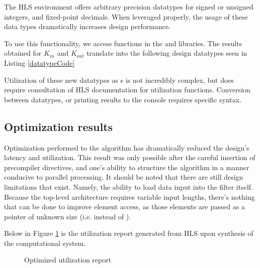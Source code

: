 \documentclass[../report_polarFIR.tex]{subfiles}
\begin{document}
The HLS environment offers arbitrary precision datatypes for signed or unsigned integers, and fixed-point decimals. When leveraged properly, the usage of these data types dramatically increases design performance. 

To use this functionality, we access functions in the  and  libraries. The results obtained for $K_{in}$ and $K_{out}$ translate into the following design datatypes seen in Listing \ref{datatypeCode}


\begin{quote}
\begin{singlespace}
    
\end{singlespace}
\end{quote}

Utilization of these new datatypes as s is not incredibly complex, but does require consultation of HLS documentation for utilization functions. Conversion between datatypes, or printing results to the console requires specific syntax.

\subsection{Optimization results}

Optimization performed to the algorithm has dramatically reduced the design's latency and utilization. This result was only possible after the careful insertion of precompiler directives, and one's ability to structure the algorithm in a manner conducive to parallel processing. It should be noted that there are still design limitations that exist. Namely, the ability to load data input into the filter itself. Because the top-level architecture requires variable input lengths, there's nothing that can be done to improve element access, as those elements are passed as a pointer of unknown size (i.e.  instead of ).

Below in Figure \ref{optimizedFIRutil} is the utilization report generated from HLS upon synthesis of the computational system. 

 \begin{figure}[h!]
 	\begin{center}
 		\fboxsep=0mm
 		\caption{Optimized utilization report}
 		\label{optimizedFIRutil}
 	\end{center}
 \end{figure}
 \FloatBarrier
 
\end{document}

